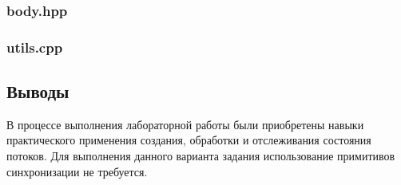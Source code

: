 \documentclass[12pt]{article}
\begin{document}
	
	
	\subsubsection*{body.hpp}
	
	
	
	\subsubsection{utils.cpp}
	
	
		
	\subsection*{Выводы}
	
	В процессе выполнения лабораторной работы были приобретены навыки практического применения создания, обработки и отслеживания состояния потоков. Для выполнения данного варианта задания использование примитивов синхронизации не требуется.
	
\end{document}
